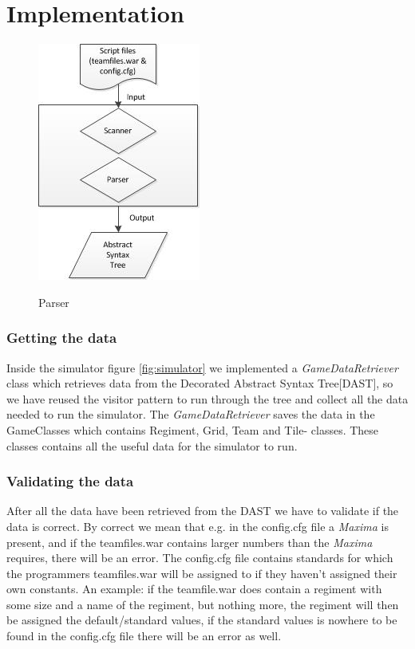 \section{Implementation}

\begin{figure}[H]
\centering
\includegraphics[scale=1]{rapport/6/figures/parser}
\label{fig:parser}
\caption{Parser}
\end{figure}

\subsubsection{Getting the data}
Inside the simulator figure \ref{fig:simulator} we implemented a \textit{GameDataRetriever} class which retrieves data from the Decorated Abstract Syntax Tree[DAST], so we have reused the visitor pattern to run through the tree and collect all the data needed to run the simulator. The \textit{GameDataRetriever} saves the data in the GameClasses which contains Regiment, Grid, Team and Tile- classes. These classes contains all the useful data for the simulator to run.
\subsubsection{Validating the data}
After all the data have been retrieved from the DAST we have to validate if the data is correct. By correct we mean that e.g. in the config.cfg file a \textit{Maxima} is present, and if the teamfiles.war contains larger numbers than the \textit{Maxima} requires, there will be an error. The config.cfg file contains standards for which the programmers teamfiles.war will be assigned to if they haven't assigned their own constants. An example: if the teamfile.war does contain a regiment with some size and a name of the regiment, but nothing more, the regiment will then be assigned the default/standard values, if the standard values is nowhere to be found in the config.cfg file there will be an error as well.

